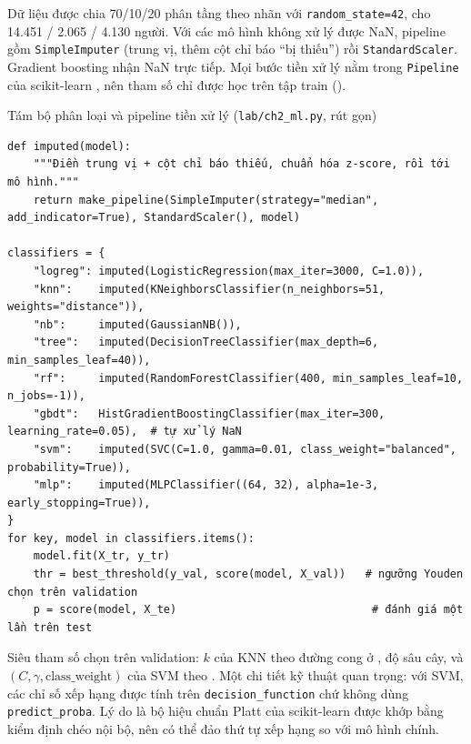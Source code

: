 Dữ liệu được chia 70/10/20 phân tầng theo nhãn với \texttt{random\_state=42}, cho 14.451 / 2.065 / 4.130 người. Với các mô hình không xử lý được NaN, pipeline gồm \texttt{SimpleImputer} (trung vị, thêm cột chỉ báo ``bị thiếu'') rồi \texttt{StandardScaler}. Gradient boosting nhận NaN trực tiếp. Mọi bước tiền xử lý nằm trong \texttt{Pipeline} của scikit-learn \cite{pedregosa2011}, nên tham số chỉ được học trên tập train ().

\begin{code}{Tám bộ phân loại và pipeline tiền xử lý (\texttt{lab/ch2\_ml.py}, rút gọn)}
\label{lst:ch2-pipe}
\begin{verbatim}
def imputed(model):
    """Điền trung vị + cột chỉ báo thiếu, chuẩn hóa z-score, rồi tới mô hình."""
    return make_pipeline(SimpleImputer(strategy="median", add_indicator=True), StandardScaler(), model)

classifiers = {
    "logreg": imputed(LogisticRegression(max_iter=3000, C=1.0)),
    "knn":    imputed(KNeighborsClassifier(n_neighbors=51, weights="distance")),
    "nb":     imputed(GaussianNB()),
    "tree":   imputed(DecisionTreeClassifier(max_depth=6, min_samples_leaf=40)),
    "rf":     imputed(RandomForestClassifier(400, min_samples_leaf=10, n_jobs=-1)),
    "gbdt":   HistGradientBoostingClassifier(max_iter=300, learning_rate=0.05),  # tự xử lý NaN
    "svm":    imputed(SVC(C=1.0, gamma=0.01, class_weight="balanced", probability=True)),
    "mlp":    imputed(MLPClassifier((64, 32), alpha=1e-3, early_stopping=True)),
}
for key, model in classifiers.items():
    model.fit(X_tr, y_tr)
    thr = best_threshold(y_val, score(model, X_val))   # ngưỡng Youden chọn trên validation
    p = score(model, X_te)                              # đánh giá một lần trên test
\end{verbatim}
\end{code}

Siêu tham số chọn trên validation: $k$ của KNN theo đường cong ở , độ sâu cây, và $(C,\gamma,\text{class\_weight})$ của SVM theo . Một chi tiết kỹ thuật quan trọng: với SVM, các chỉ số xếp hạng được tính trên \texttt{decision\_function} chứ không dùng \texttt{predict\_proba}. Lý do là bộ hiệu chuẩn Platt của scikit-learn được khớp bằng kiểm định chéo nội bộ, nên có thể đảo thứ tự xếp hạng so với mô hình chính.

